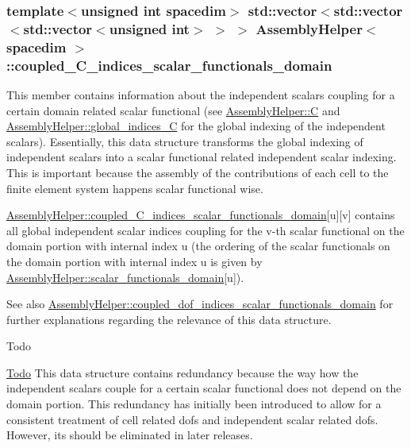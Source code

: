 \subsubsection[{\texorpdfstring{coupled\+\_\+\+C\+\_\+indices\+\_\+scalar\+\_\+functionals\+\_\+domain}{coupled_C_indices_scalar_functionals_domain}}]{\setlength{\rightskip}{0pt plus 5cm}template$<$unsigned int spacedim$>$ std\+::vector$<$std\+::vector$<$std\+::vector$<$unsigned int$>$ $>$ $>$ {\bf Assembly\+Helper}$<$ spacedim $>$\+::coupled\+\_\+\+C\+\_\+indices\+\_\+scalar\+\_\+functionals\+\_\+domain\hspace{0.3cm}{\ttfamily [private]}}\hypertarget{class_assembly_helper_a0edd25820c92a25ae87fc240f4916804}{}\label{class_assembly_helper_a0edd25820c92a25ae87fc240f4916804}
This member contains information about the independent scalars coupling for a certain domain related scalar functional (see \hyperlink{class_assembly_helper_aa5234a46be82cfe7d92678169d38f326}{Assembly\+Helper\+::C} and \hyperlink{class_assembly_helper_a9a8f0e8ea8c67ce9429c16a2017cafdc}{Assembly\+Helper\+::global\+\_\+indices\+\_\+C} for the global indexing of the independent scalars). Essentially, this data structure transforms the global indexing of independent scalars into a scalar functional related independent scalar indexing. This is important because the assembly of the contributions of each cell to the finite element system happens scalar functional wise.

\hyperlink{class_assembly_helper_a0edd25820c92a25ae87fc240f4916804}{Assembly\+Helper\+::coupled\+\_\+\+C\+\_\+indices\+\_\+scalar\+\_\+functionals\+\_\+domain}\mbox{[}{\ttfamily u}\mbox{]}\mbox{[}{\ttfamily v}\mbox{]} contains all global independent scalar indices coupling for the {\ttfamily v-\/th} scalar functional on the domain portion with internal index {\ttfamily u} (the ordering of the scalar functionals on the domain portion with internal index {\ttfamily u} is given by \hyperlink{class_assembly_helper_aa6fa619e4c2582e95950e878cd06628e}{Assembly\+Helper\+::scalar\+\_\+functionals\+\_\+domain}\mbox{[}{\ttfamily u}\mbox{]}).

See also \hyperlink{class_assembly_helper_a1a26b40224e3f04e5168accc91486493}{Assembly\+Helper\+::coupled\+\_\+dof\+\_\+indices\+\_\+scalar\+\_\+functionals\+\_\+domain} for further explanations regarding the relevance of this data structure.

\begin{DoxyRefDesc}{Todo}
\item[\hyperlink{todo__todo000003}{Todo}]This data structure contains redundancy because the way how the independent scalars couple for a certain scalar functional does not depend on the domain portion. This redundancy has initially been introduced to allow for a consistent treatment of cell related dofs and independent scalar related dofs. However, its should be eliminated in later releases.\end{DoxyRefDesc}
